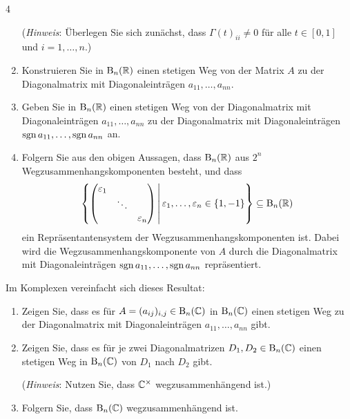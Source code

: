 \begin{question}[subtitle = Die Wegzusammenhangskomponenten der oberen Dreiecksmatrizen]{4}
\begin{enumerate}[leftmargin=*, resume]
      (\emph{Hinweis}:
       Überlegen Sie sich zunächst, dass $\Gamma(t)_{ii} \neq 0$ für alle $t \in [0,1]$ und $i = 1, \dotsc, n$.)
    \item
      Konstruieren Sie in $\operatorname{B}_n(\mathbb{R})$ einen stetigen Weg von der Matrix $A$ zu der Diagonalmatrix mit Diagonaleinträgen $a_{11}, \dotsc, a_{nn}$.
    \item
      Geben Sie in $\operatorname{B}_n(\mathbb{R})$ einen stetigen Weg von der Diagonalmatrix mit Diagonaleinträgen $a_{11}, \dotsc, a_{nn}$ zu der Diagonalmatrix mit Diagonaleinträgen $\operatorname{sgn} a_{11}, \dotsc, \operatorname{sgn} a_{nn}$ an.
    \item
      Folgern Sie aus den obigen Aussagen, dass $\operatorname{B}_n(\mathbb{R})$ aus $2^n$ Wegzusammenhangskomponenten besteht, und dass
      \[
        \left\{
          \begin{pmatrix}
            \varepsilon_1 &         &                 \\
                          & \ddots  &                 \\
                          &         & \varepsilon_n
          \end{pmatrix}
          \,\middle|\,
          \varepsilon_1, \dotsc, \varepsilon_n \in \{1,-1\}
        \right\}
        \subseteq
        \operatorname{B}_n(\mathbb{R})
      \]
      ein Repräsentantensystem der Wegzusammenhangskomponenten ist.
      Dabei wird die Weg\-zu\-sam\-men\-hangs\-kom\-po\-nen\-te von $A$ durch die Diagonalmatrix mit Diagonaleinträgen $\operatorname{sgn} a_{11}, \dotsc, \operatorname{sgn} a_{nn}$ repräsentiert.
  \end{enumerate}
  Im Komplexen vereinfacht sich dieses Resultat:
  \begin{enumerate}[leftmargin=*, resume]
    \item
      Zeigen Sie, dass es für $A = (a_{ij})_{i,j} \in \operatorname{B}_n(\mathbb{C})$ in $\operatorname{B}_n(\mathbb{C})$ einen stetigen Weg zu der Diagonalmatrix mit Diagonaleinträgen $a_{11}, \dotsc, a_{nn}$ gibt.
    \item
      Zeigen Sie, dass es für je zwei Diagonalmatrizen $D_1, D_2 \in \operatorname{B}_n(\mathbb{C})$ einen stetigen Weg in $\operatorname{B}_n(\mathbb{C})$ von $D_1$ nach $D_2$ gibt.
      
      (\emph{Hinweis}:
       Nutzen Sie, dass $\mathbb{C}^\times$ wegzusammenhängend ist.)
    \item
      Folgern Sie, dass $\operatorname{B}_n(\mathbb{C})$ wegzusammenhängend ist.
  \end{enumerate}
\end{question}










